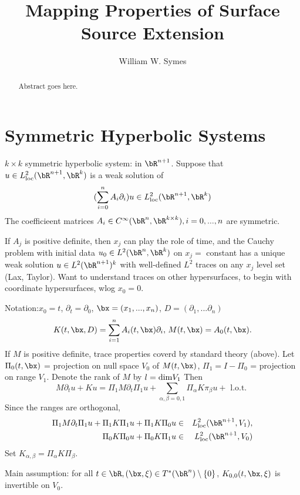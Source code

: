 \title{Mapping Properties of Surface Source Extension}
\author{William W. Symes}

\begin{abstract}
  Abstract goes here.
\end{abstract}

\section{Symmetric Hyperbolic Systems}
$k \times  k$ symmetric hyperbolic system: in $\bR^{n+1}$. Suppose that $u \in L^2_{\rm loc}(\bR^{n+1},\bR^k)$ is a weak solution of
\begin{equation}
  \label{eqn:shs}
  (\sum_{i=0}^n A_i\partial_i ) u \in L^2_{\rm loc}(\bR^{n+1},\bR^k)
\end{equation}
The coefficieent matrices $A_i \in C^{\infty}(\bR^n, \bR^{k \times k}), i=0,...,n$ are symmetric. 

If $A_j$ is positive definite, then $x_j$ can play the role of time, and the Cauchy problem with initial data $u_0 \in L^2(\bR^n,\bR^k)$  on $x_j=$ constant has a unique weak solution $u \in L^2(\bR^{n+1})^k$ with well-defined $L^2$ traces on any $x_j$ level set (Lax, Taylor). Want to understand traces on other hypersurfaces, to begin with coordinate hypersurfaces, wlog $x_0=0$.

Notation:$x_0=t$, $\partial_t=\partial_0$, $\bx = (x_1,...,x_n)$, $D=(\partial_1,...\partial_n)$
\[
  K(t,\bx,D)= \sum_{i=1}^n A_i(t,\bx)\partial_i, \, M(t,\bx) = A_0(t,\bx).
\]
If $M$ is positive definite, trace properties coverd by standard theory (above). Let $\Pi_0(t,\bx)$ = projection on null space $V_0$ of $M(t,\bx)$, $\Pi_1=I-\Pi_0$ = projection on range $V_1$. Denote the rank of $M$ by $l={\rm dim} V_1$ Then
\[
  M\partial_t u + Ku = \Pi_1 M \partial_t \Pi_1 u + \sum_{\alpha,\beta=0,1} \Pi_{\alpha}K\pi_{\beta}u + \mbox{ l.o.t. }
\]
Since the ranges are orthogonal,
\begin{eqnarray}
  \Pi_1 M \partial_t \Pi_1 u + \Pi_1 K \Pi_1 u + \Pi_1 K \Pi_0 u & \in & L^2_{\rm loc}(\bR^{n+1},V_1),
  \label{eqn:decomp1} \\
  \Pi_0 K \Pi_0 u + \Pi_0 K \Pi_1 u & \in & L^2_{\rm loc}(\bR^{n+1},V_0)
  \label{eqn:decomp0}
\end{eqnarray}
Set $K_{\alpha,\beta} = \Pi_{\alpha}K\Pi_{\beta}$.

Main assumption: for all $t \in \bR, (\bx,\xi) \in T^*(\bR^n)\setminus \{0\}$, $K_{0,0}(t,\bx,\xi)$ is invertible on $V_0$.

